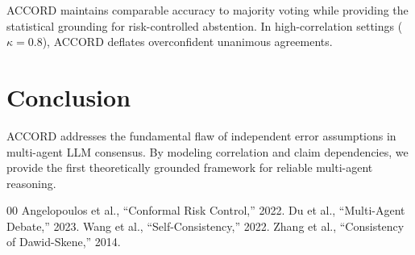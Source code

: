 \documentclass[conference]{IEEEtran}
\begin{document}
ACCORD maintains comparable accuracy to majority voting while providing the statistical grounding for risk-controlled abstention. In high-correlation settings ($\kappa=0.8$), ACCORD deflates overconfident unanimous agreements.

\section{Conclusion}
ACCORD addresses the fundamental flaw of independent error assumptions in multi-agent LLM consensus. By modeling correlation and claim dependencies, we provide the first theoretically grounded framework for reliable multi-agent reasoning.

\begin{thebibliography}{00}
 Angelopoulos et al., ``Conformal Risk Control,'' 2022.
 Du et al., ``Multi-Agent Debate,'' 2023.
 Wang et al., ``Self-Consistency,'' 2022.
 Zhang et al., ``Consistency of Dawid-Skene,'' 2014.
\end{thebibliography}
\end{document}
